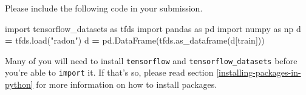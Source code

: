 \documentclass[
  12pt,
  krantz2]{krantz}
\makeatletter
\newenvironment{Shaded}{\begin{snugshade}}{\end{snugshade}}
\newcommand{\ImportTok}[1]{#1}
\newcommand{\NormalTok}[1]{#1}
\newcommand{\OperatorTok}[1]{\textcolor[rgb]{0.43,0.43,0.43}{\textbf{#1}}}
\newcommand{\StringTok}[1]{\textcolor[rgb]{0.5,0.5,0.5}{#1}}
\newenvironment{kframe}{%
\medskip{}
\setlength{\fboxsep}{.8em}
 \def\at@end@of@kframe{}%
 \ifinner\ifhmode%
  \def\at@end@of@kframe{\end{minipage}}%
  \begin{minipage}{\columnwidth}%
 \fi\fi%
 \def\FrameCommand##1{\hskip\@totalleftmargin \hskip-\fboxsep
 \colorbox{shadecolor}{##1}\hskip-\fboxsep
     \hskip-\linewidth \hskip-\@totalleftmargin \hskip\columnwidth}%
 \MakeFramed {\advance\hsize-\width
   \@totalleftmargin\z@ \linewidth\hsize
   \@setminipage}}%
 {\par\unskip\endMakeFramed%
 \at@end@of@kframe}
\renewenvironment{Shaded}{\begin{kframe}}{\end{kframe}}
\makeatother
\begin{document}
Please include the following code in your submission.

\begin{Shaded}
\begin{Highlighting}[]
\ImportTok{import}\NormalTok{ tensorflow\_datasets }\ImportTok{as}\NormalTok{ tfds}
\ImportTok{import}\NormalTok{ pandas }\ImportTok{as}\NormalTok{ pd}
\ImportTok{import}\NormalTok{ numpy }\ImportTok{as}\NormalTok{ np}
\NormalTok{d }\OperatorTok{=}\NormalTok{ tfds.load(}\StringTok{"radon"}\NormalTok{)}
\NormalTok{d }\OperatorTok{=}\NormalTok{ pd.DataFrame(tfds.as\_dataframe(d[}\StringTok{\textquotesingle{}train\textquotesingle{}}\NormalTok{]))}
\end{Highlighting}
\end{Shaded}

Many of you will need to install \texttt{tensorflow} and \texttt{tensorflow\_datasets} before you're able to \texttt{import} it. If that's so, please read section \ref{installing-packages-in-python} for more information on how to install packages.
\end{document}
